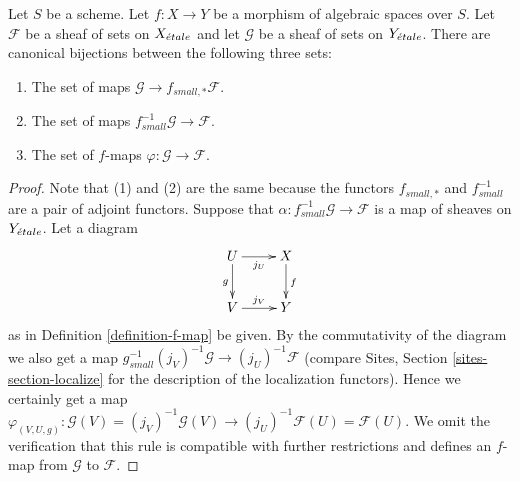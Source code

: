 \begin{lemma}
\label{lemma-f-map}
Let $S$ be a scheme.
Let $f : X \to Y$ be a morphism of algebraic spaces over $S$.
Let $\mathcal{F}$ be a sheaf of sets on $X_{\acute{e}tale}$ and
let $\mathcal{G}$ be a sheaf of sets on $Y_{\acute{e}tale}$.
There are canonical bijections between the following three sets:
\begin{enumerate}
\item The set of maps $\mathcal{G} \to f_{small, *}\mathcal{F}$.
\item The set of maps $f_{small}^{-1}\mathcal{G} \to \mathcal{F}$.
\item The set of $f$-maps $\varphi : \mathcal{G} \to \mathcal{F}$.
\end{enumerate}
\end{lemma}

\begin{proof}
Note that (1) and (2) are the same because the functors $f_{small, *}$
and $f_{small}^{-1}$ are a pair of adjoint functors.
Suppose that $\alpha : f_{small}^{-1}\mathcal{G} \to \mathcal{F}$
is a map of sheaves on $Y_{\acute{e}tale}$. Let a diagram
$$
\xymatrix{
U \ar[d]_g \ar[r]_{j_U} & X \ar[d]^f \\
V \ar[r]^{j_V} & Y
}
$$
as in Definition \ref{definition-f-map} be given.
By the commutativity of the diagram we also get a map
$g_{small}^{-1}(j_V)^{-1}\mathcal{G} \to (j_U)^{-1}\mathcal{F}$
(compare Sites, Section \ref{sites-section-localize} for the
description of the localization functors). Hence we certainly
get a map
$\varphi_{(V, U, g)} :
\mathcal{G}(V) = (j_V)^{-1}\mathcal{G}(V)
\to
(j_U)^{-1}\mathcal{F}(U) = \mathcal{F}(U)$.
We omit the verification that this rule is compatible with
further restrictions and defines an $f$-map from $\mathcal{G}$ to
$\mathcal{F}$.


\end{proof}
